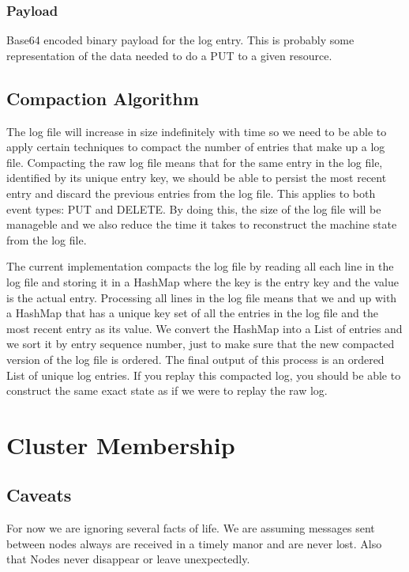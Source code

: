 \subsubsection{Payload}
Base64 encoded binary payload for the log entry.  This is probably some representation of the data needed to do a PUT to a given resource.


\subsection{Compaction Algorithm}

The log file will increase in size indefinitely with time so we  need to be able to apply certain techniques to compact the number of entries that make up a log file. Compacting the raw log file means that for the same entry in the log file, identified by its unique entry key, we should be able to persist the most recent entry and discard the previous entries from the log file. This applies to both event types: PUT and DELETE. By doing this, the size of the log file will be manageble and we also reduce the time it takes to reconstruct the machine state from the log file.

The current implementation compacts the log file by reading all each line in the log file and storing it in a HashMap where the key is the entry key and the value is the actual entry. Processing all lines in the log file means that we and up with a HashMap that has a unique key set of all the entries in the log file and the most recent entry as its value. We convert the HashMap into a List of entries and we sort it by entry sequence number, just to make sure that the new compacted version of the log file is ordered. The final output of this process is an ordered List of unique log entries. If you replay this compacted log, you should be able to construct the same exact state as if we were to replay the raw log.

\section{Cluster Membership}
\subsection{Caveats}
For now we are ignoring several facts of life.  We are assuming messages sent between nodes always are received in a timely manor and are never lost.  Also that Nodes never disappear or leave unexpectedly.

